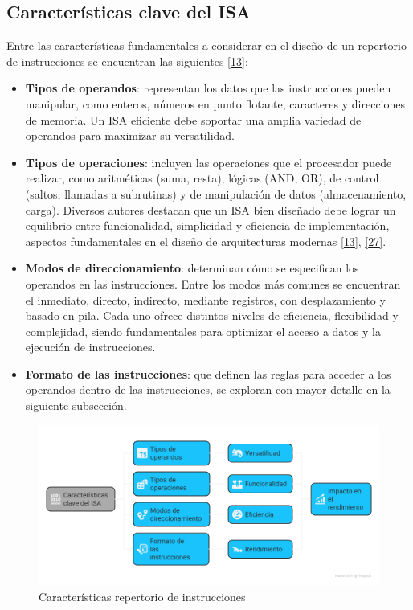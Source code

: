 \documentclass[12pt,oneside]{templates/unerthesis}
\providecommand{\tightlist}{%
  \setlength{\itemsep}{0pt}\setlength{\parskip}{0pt}}
\begin{document}
\hypertarget{caracteruxedsticas-clave-del-isa}{%
\subsection{Características clave del ISA}\label{caracteruxedsticas-clave-del-isa}}

Entre las características fundamentales a considerar en el diseño de un repertorio de instrucciones se encuentran las siguientes \protect\hyperlink{ref-hennessy2017computer}{{[}13{]}}:

\begin{itemize}
\tightlist
\item
  \textbf{Tipos de operandos}: representan los datos que las instrucciones pueden manipular, como enteros, números en punto flotante, caracteres y direcciones de memoria. Un ISA eficiente debe soportar una amplia variedad de operandos para maximizar su versatilidad.
\item
  \textbf{Tipos de operaciones}: incluyen las operaciones que el procesador puede realizar, como aritméticas (suma, resta), lógicas (AND, OR), de control (saltos, llamadas a subrutinas) y de manipulación de datos (almacenamiento, carga). Diversos autores destacan que un ISA bien diseñado debe lograr un equilibrio entre funcionalidad, simplicidad y eficiencia de implementación, aspectos fundamentales en el diseño de arquitecturas modernas \protect\hyperlink{ref-hennessy2017computer}{{[}13{]}}, \protect\hyperlink{ref-null_essentials_2014}{{[}27{]}}.
\item
  \textbf{Modos de direccionamiento}: determinan cómo se especifican los operandos en las instrucciones. Entre los modos más comunes se encuentran el inmediato, directo, indirecto, mediante registros, con desplazamiento y basado en pila. Cada uno ofrece distintos niveles de eficiencia, flexibilidad y complejidad, siendo fundamentales para optimizar el acceso a datos y la ejecución de instrucciones.
\item
  \textbf{Formato de las instrucciones}: que definen las reglas para acceder a los operandos dentro de las instrucciones, se exploran con mayor detalle en la siguiente subsección.
\end{itemize}

\begin{figure}

{\centering \includegraphics[width=1\linewidth]{images/isa} 

}

\caption{Características repertorio de instrucciones}\label{fig:repInstCaracteristicas}
\end{figure}
\end{document}
